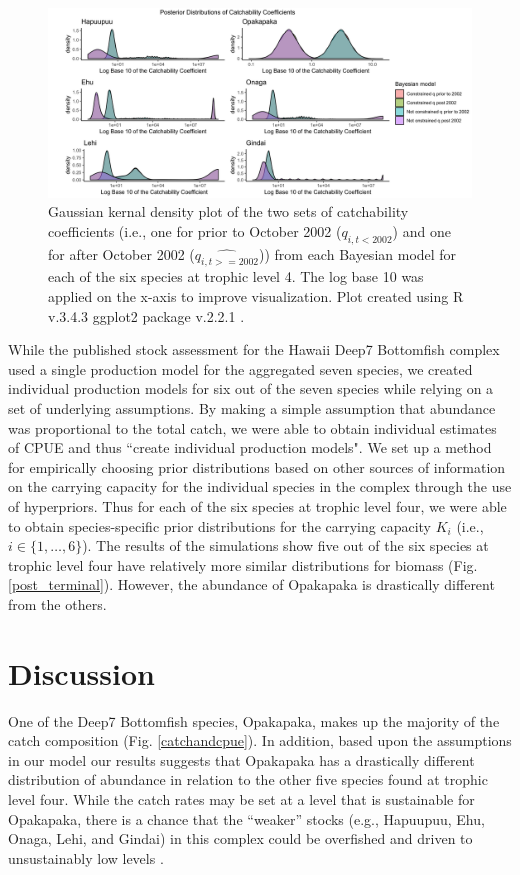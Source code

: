 \documentclass[oneside,12pt,final]{sty/ucthesis-CA2012}
\let\cite\citep                             %
\begin{document}
\begin{mainmatter}
\begin{figure}[H]
     \centering
       \includegraphics[width=\textwidth]{fig/post_catchability}
    \caption{Gaussian kernal density plot of the two sets of catchability coefficients (i.e., one for prior to October 2002 ($\widehat{q_{i,t<2002}}$) and one for after October 2002 ($\widehat{q_{i,t>=2002}}$)) from each Bayesian model for each of the six species at trophic level 4. The log base 10 was applied on the x-axis to improve visualization. Plot created using R v.3.4.3 \cite{Rcite} ggplot2 package v.2.2.1 \cite{ggplot}.}
    \label{post_catchability}
\end{figure}

While the published stock assessment for the Hawaii Deep7 Bottomfish complex used a single production model for the aggregated seven species, we created individual production models for six out of the seven species while relying on a set of underlying assumptions. By making a simple assumption that abundance was proportional to the total catch, we were able to obtain individual estimates of CPUE and thus ``create individual production models". We set up a method for empirically choosing prior distributions based on other sources of information on the carrying capacity for the individual species in the complex through the use of hyperpriors. Thus for each of the six species at trophic level four, we were able to obtain species-specific prior distributions for the carrying capacity $K_i$ (i.e., $i \in \{1,\dots,6\}$). The results of the simulations show five out of the six species at trophic level four have relatively more similar distributions for biomass (Fig. \ref{post_terminal}). However, the abundance of Opakapaka is drastically different from the others. 


\section{Discussion}
 One of the Deep7 Bottomfish species, Opakapaka, makes up the majority of the catch composition (Fig. \ref{catchandcpue}). In addition, based upon the assumptions in our model our results suggests that Opakapaka has a drastically different distribution of abundance in relation to the other five species found at trophic level four. While the catch rates may be set at a level that is sustainable for Opakapaka, there is a chance that the ``weaker” stocks (e.g., Hapuupuu, Ehu, Onaga, Lehi, and Gindai) in this complex could be overfished and driven to unsustainably low levels \cite{hastings2017marine}. 


\end{mainmatter}
\end{document}
